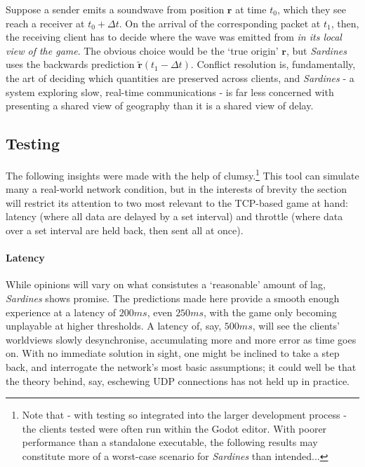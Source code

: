 \documentclass[a4paper, 9pt]{article}
\begin{document}
\begin{flushleft}
\vspace{5pt}\noindent
Suppose a sender emits a soundwave from position $\mathbf{r}$ at time $t_0$, which they see reach a receiver at $t_0+\Delta t$. On the arrival of the corresponding packet at $t_1$, then, the receiving client has to decide where the wave was emitted from \textit{in its local view of the game}. The obvious choice would be the `true origin' $\mathbf{r}$, but \textit{Sardines} uses the backwards prediction $\mathbf{\tilde{r}}(t_1-\Delta t)$. Conflict resolution is, fundamentally, the art of deciding which quantities are preserved across clients, and \textit{Sardines} - a system exploring slow, real-time communications - is far less concerned with presenting a shared view of geography than it is a shared view of delay.

\subsection*{Testing}\label{Testing}

\vspace{5pt}\noindent
The following insights were made with the help of clumsy.\footnote{Note that - with testing so integrated into the larger development process - the clients tested were often run within the Godot editor. With poorer performance than a standalone executable, the following results may constitute more of a worst-case scenario for \textit{Sardines} than intended...} This tool can simulate many a real-world network condition, but in the interests of brevity the section will restrict its attention to two most relevant to the TCP-based game at hand: latency (where all data are delayed by a set interval) and throttle (where data over a set interval are held back, then sent all at once).

\paragraph{Latency} While opinions will vary on what consistutes a `reasonable' amount of lag, \textit{Sardines} shows promise. The predictions made here provide a smooth enough experience at a latency of $200ms$, even $250ms$, with the game only becoming unplayable at higher thresholds. A latency of, say, $500ms$, will see the clients' worldviews slowly desynchronise, accumulating more and more error as time goes on. With no immediate solution in sight, one might be inclined to take a step back, and interrogate the network's most basic assumptions; it could well be that the theory behind, say, eschewing UDP connections has not held up in practice.%



\end{flushleft}
\end{document}

